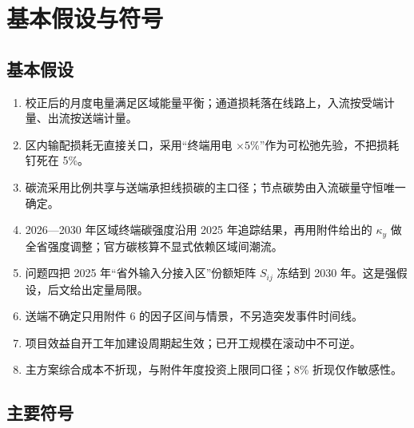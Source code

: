 \documentclass[UTF8,a4paper,zihao=-4,fontset=fandol]{ctexart}
\begin{document}
\section{基本假设与符号}

\subsection{基本假设}

\begin{enumerate}[label=\textbf{H\arabic*.}]
\item 校正后的月度电量满足区域能量平衡；通道损耗落在线路上，入流按受端计量、出流按送端计量。
\item 区内输配损耗无直接关口，采用“终端用电 $\times 5\%$”作为可松弛先验，不把损耗钉死在 5\%。
\item 碳流采用比例共享与送端承担线损碳的主口径；节点碳势由入流碳量守恒唯一确定。
\item 2026—2030 年区域终端碳强度沿用 2025 年追踪结果，再用附件给出的 $\kappa_y$ 做全省强度调整；官方碳核算不显式依赖区域间潮流。
\item 问题四把 2025 年“省外输入分接入区”份额矩阵 $S_{ij}$ 冻结到 2030 年。这是强假设，后文给出定量局限。
\item 送端不确定只用附件 6 的因子区间与情景，不另造突发事件时间线。
\item 项目效益自开工年加建设周期起生效；已开工规模在滚动中不可逆。
\item 主方案综合成本不折现，与附件年度投资上限同口径；8\% 折现仅作敏感性。
\end{enumerate}

\subsection{主要符号}
\end{document}
